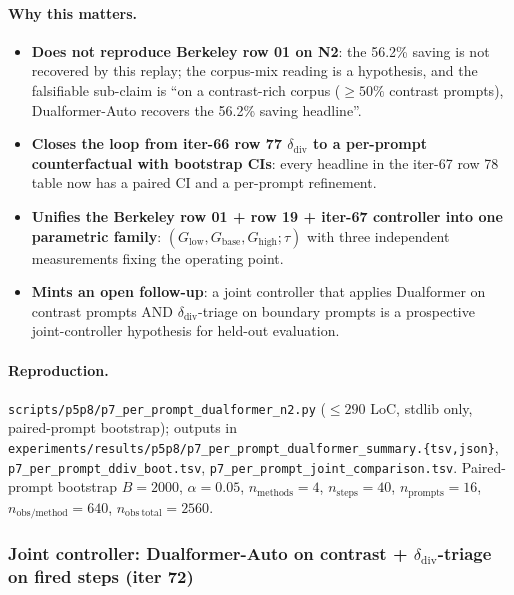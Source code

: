 \paragraph{Why this matters.}
\begin{itemize}
    \item \textbf{Does not reproduce Berkeley row 01 on N2}: the 56.2\%
        saving is not recovered by this replay; the corpus-mix reading is
        a hypothesis, and the falsifiable sub-claim is
        ``on a contrast-rich corpus ($\geq 50\%$ contrast prompts),
        Dualformer-Auto recovers the 56.2\% saving headline''.
    \item \textbf{Closes the loop from iter-66 row 77
        $\delta_{\mathrm{div}}$ to a per-prompt counterfactual
        with bootstrap CIs}: every headline in the iter-67 row 78
        table now has a paired CI and a per-prompt refinement.
    \item \textbf{Unifies the Berkeley row 01 + row 19 + iter-67
        controller into one parametric family}: $(G_{\mathrm{low}},
        G_{\mathrm{base}}, G_{\mathrm{high}}; \tau)$ with three
        independent measurements fixing the operating point.
    \item \textbf{Mints an open follow-up}: a joint controller that
        applies Dualformer on contrast prompts AND
        $\delta_{\mathrm{div}}$-triage on boundary prompts is a
        prospective joint-controller hypothesis for held-out evaluation.
\end{itemize}

\paragraph{Reproduction.}
\texttt{scripts/p5p8/p7\_per\_prompt\_dualformer\_n2.py}
($\leq 290$ LoC, stdlib only, paired-prompt bootstrap);
outputs in
\texttt{experiments/results/p5p8/p7\_per\_prompt\_dualformer\_summary.\{tsv,json\}},
\texttt{p7\_per\_prompt\_ddiv\_boot.tsv},
\texttt{p7\_per\_prompt\_joint\_comparison.tsv}.
Paired-prompt bootstrap $B{=}2000$, $\alpha{=}0.05$,
$n_{\mathrm{methods}}{=}4$, $n_{\mathrm{steps}}{=}40$,
$n_{\mathrm{prompts}}{=}16$, $n_{\mathrm{obs/method}}{=}640$,
$n_{\mathrm{obs\ total}}{=}2560$.

\subsubsection{Joint controller: Dualformer-Auto on contrast +
\texorpdfstring{$\delta_{\mathrm{div}}$}{\delta\_div}-triage on fired steps (iter 72)}
\label{sec:p7-joint-controller}

